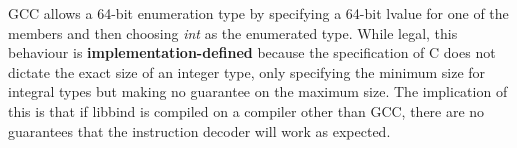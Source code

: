 GCC allows a 64-bit enumeration type by specifying a 64-bit lvalue for one of the members and then choosing \emph{int} as the enumerated type. While legal, this behaviour is \textbf{implementation-defined} because the specification of C does not dictate the exact size of an integer type, only specifying the minimum size for integral types but making no guarantee on the maximum size. The implication of this is that if libbind is compiled on a compiler other than GCC, there are no guarantees that the instruction decoder will work as expected.



